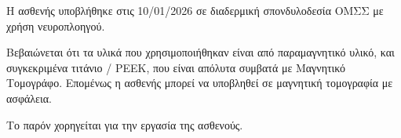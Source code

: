 \documentclass[10pt,greek]{article}
\begin{document}
\begin{PatientInfo}
\end{PatientInfo}

Η ασθενής υποβλήθηκε στις 10/01/2026 σε διαδερμική σπονδυλοδεσία ΟΜΣΣ με χρήση νευροπλοηγού.

Βεβαιώνεται ότι τα υλικά που χρησιμοποιήθηκαν είναι από παραμαγνητικό υλικό, και συγκεκριμένα τιτάνιο / PEEK, που είναι απόλυτα συμβατά με Μαγνητικό Τομογράφο. Επομένως η ασθενής μπορεί να υποβληθεί σε μαγνητική τομογραφία με ασφάλεια.

Το παρόν χορηγείται για την εργασία της ασθενούς.
\end{document}

